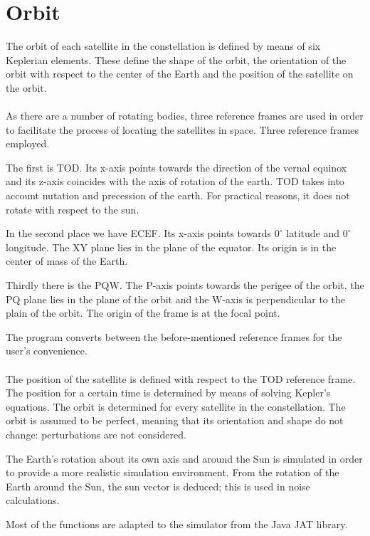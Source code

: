 \section{Orbit}
\label{orbit}
The orbit of each satellite in the constellation is defined by means of six Keplerian elements. These define the shape of the orbit, the orientation of the orbit with respect to the center of the Earth and the position of the satellite on the orbit.\\\\
As there are a number of rotating bodies, three reference frames are used in order to facilitate the process of locating the satellites in space. Three reference frames employed.

The first is \ac{TOD}. Its x-axis points towards the direction of the vernal equinox and its z-axis coincides with the axis of rotation of the earth. \ac{TOD} takes into account nutation and precession of the earth. For practical reasons, it does not rotate with respect to the sun.
 
In the second place we have \ac{ECEF}. Its x-axis points towards $0^\circ$ latitude and $0^\circ$ longitude. The XY plane lies in the plane of the equator. Its origin is in the center of mass of the Earth. 

Thirdly there is the PQW. The P-axis points towards the perigee of the orbit, the PQ plane lies in the plane of the orbit and the W-axis is perpendicular to the plain of the orbit. The origin of the frame is at the focal point. 

The program converts between the before-mentioned reference frames for the user's convenience.\\\\
The position of the satellite is defined with respect to the \acs{TOD} reference frame.  The position for a certain time is determined by means of solving Kepler's equations. The orbit is determined for every satellite in the constellation. The orbit is assumed to be perfect, meaning that its orientation and shape do not change: perturbations are not considered. 

The Earth's rotation about its own axis and around the Sun is simulated in order to provide a more realistic simulation environment. From the rotation of the Earth around the Sun, the sun vector is deduced; this is used in noise calculations.

Most of the functions are adapted to the simulator from the Java \ac{JAT} library. 

